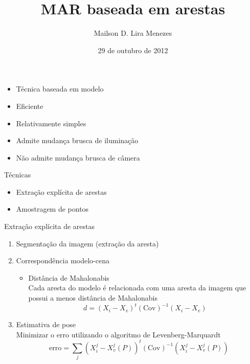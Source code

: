\documentclass{beamer}
\title{MAR baseada em arestas}
\author{Mailson D. Lira Menezes}
\institute{Universidade Federal de Pernambuco}
\date{29 de outubro de 2012}
\begin{document}
\begin{frame}
\titlepage
\end{frame}

\begin{frame}
    \begin{itemize}
        \item Técnica baseada em modelo
        \item Eficiente
        \item Relativamente simples
        \item Admite mudança brusca de iluminação
        \item Não admite mudança brusca de câmera
    \end{itemize}
\end{frame}

\begin{frame}{Técnicas}
    \begin{itemize}
        \item Extração explícita de arestas
        \item Amostragem de pontos
    \end{itemize}
\end{frame}

\begin{frame}{Extração explícita de arestas}
    \begin{enumerate}
        \item Segmentação da imagem (extração da aresta)
        \item Correspondência modelo-cena
            \begin{itemize}
                \item Distância de Mahalonabis \\
                    Cada aresta do modelo é relacionada com uma aresta da imagem que possui a menos distância de Mahalonabis
                    \[
                        d = (X_i - X_v)^t(\textrm{Cov})^{-1}(X_i - X_v)
                    \]
            \end{itemize}
        \item Estimativa de pose \\
            Minimizar o erro utilizando o algoritmo de Levenberg-Marquardt
            \[
                \textrm{erro} = \sum_j(X^j_i - X^j_v(P))^t(\textrm{Cov})^{-1}(X^j_i - X^j_v(P))
            \]
    \end{enumerate}
\end{frame}
\end{document}
